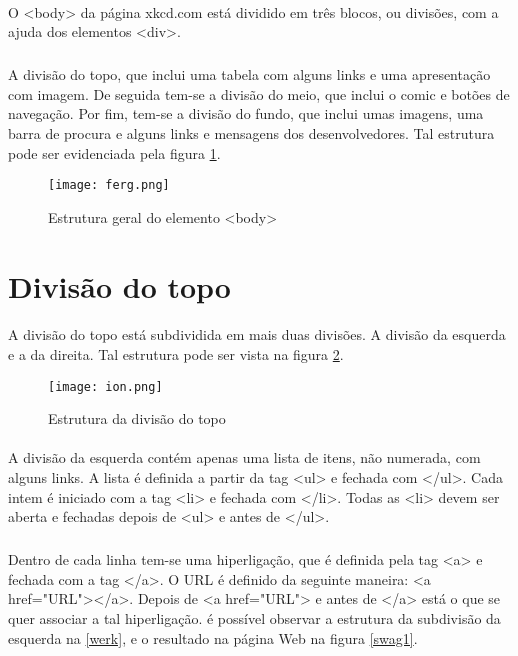 \documentclass[a4paper,12pt,openright,oneside]{report}
\begin{document}
\paragraph{}
O <body> da página xkcd.com está dividido em três blocos, ou divisões, com a ajuda dos elementos <div>. 
\subparagraph{}
A divisão do topo, que inclui uma tabela com alguns links e uma apresentação com imagem. De seguida tem-se a divisão do meio, que inclui o comic e botões de navegação. Por fim, tem-se a divisão do fundo, que inclui umas imagens, uma barra de procura e alguns links e mensagens dos desenvolvedores. Tal estrutura pode ser evidenciada pela figura \ref{ferg}.\cite{PP}

\begin{figure}[h!]
\center
\texttt{[image: ferg.png]}
\caption{Estrutura geral do elemento <body>}
\label{ferg}
\end{figure}

\pagebreak
\section{Divisão do topo}
\paragraph{}
A divisão do topo está subdividida em mais duas divisões. A divisão da esquerda e a da direita. Tal estrutura pode ser vista na figura \ref{ion}.

\begin{figure}[p]
\center
\texttt{[image: ion.png]}
\caption{Estrutura da divisão do topo}
\label{ion}
\end{figure}

\paragraph{}
A divisão da esquerda contém apenas uma lista de itens, não numerada, com alguns links. A lista é definida a partir da tag <ul> e fechada com </ul>. Cada intem é iniciado com a tag <li> e fechada com </li>. Todas as <li> devem ser aberta e fechadas depois de <ul> e antes de </ul>. 
\subparagraph{}
Dentro de cada linha tem-se uma hiperligação, que é definida pela tag <a> e fechada com a tag </a>. O URL é definido da seguinte maneira: <a href="URL"></a>. Depois de <a href="URL"> e antes de </a> está o que se quer associar a tal hiperligação. é possível observar a estrutura da subdivisão da esquerda na \ref{werk}, e o resultado na página Web na figura \ref{swag1}.
\end{document}
